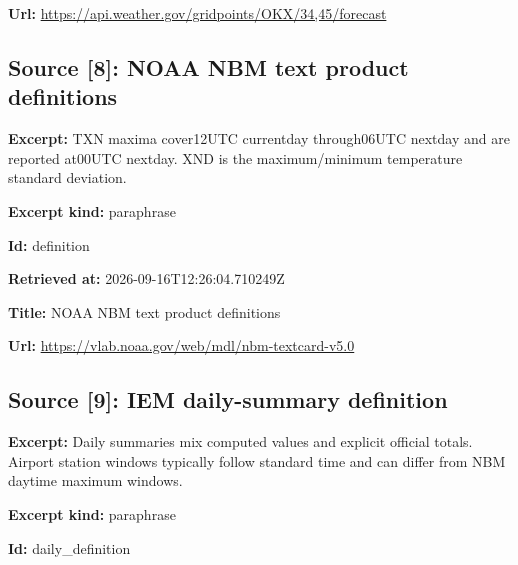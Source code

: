 \documentclass[11pt]{article}
\begin{document}
\par\noindent\textbf{Url:} \href{https://api.weather.gov/gridpoints/OKX/34,45/forecast}{https://api.\hspace{0pt}weather.gov/\hspace{0pt}gridpoints/O\hspace{0pt}KX/34,45/for\hspace{0pt}ecast}

\subsection*{\textcolor{epdarkgreen}{Source [8]: NOAA NBM text product definitions}}
\par\noindent\textbf{Excerpt:} TXN maxima cover12UTC currentday through06UTC nextday and are reported at00UTC nextday. XND is the maximum/minimum temperature standard deviation.

\par\noindent\textbf{Excerpt kind:} paraphrase

\par\noindent\textbf{Id:} definition

\par\noindent\textbf{Retrieved at:} 2026-09-16T12:26:04.710249Z

\par\noindent\textbf{Title:} NOAA NBM text product definitions

\par\noindent\textbf{Url:} \href{https://vlab.noaa.gov/web/mdl/nbm-textcard-v5.0}{https://vlab\hspace{0pt}.noaa.gov/we\hspace{0pt}b/mdl/nbm-te\hspace{0pt}xtcard-v5.0}

\subsection*{\textcolor{epdarkgreen}{Source [9]: IEM daily-summary definition}}
\par\noindent\textbf{Excerpt:} Daily summaries mix computed values and explicit official totals. Airport station windows typically follow standard time and can differ from NBM daytime maximum windows.

\par\noindent\textbf{Excerpt kind:} paraphrase

\par\noindent\textbf{Id:} daily\_definition
\end{document}
